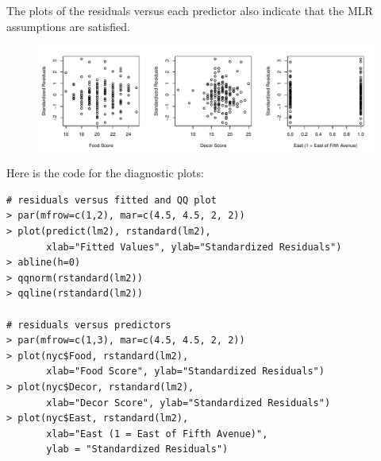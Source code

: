 \documentclass[10pt]{beamer}\usepackage[]{graphicx}\usepackage[]{color}
\begin{document}
\begin{frame}
The plots of the residuals versus each predictor also indicate that the MLR assumptions are satisfied.
\begin{figure}
\includegraphics[scale=0.55]{figure/resid_x.pdf}
\end{figure}
\end{frame}

\begin{frame}[fragile]
Here is the code for the diagnostic plots:
\small
\begin{verbatim}
# residuals versus fitted and QQ plot
> par(mfrow=c(1,2), mar=c(4.5, 4.5, 2, 2))
> plot(predict(lm2), rstandard(lm2), 
       xlab="Fitted Values", ylab="Standardized Residuals")
> abline(h=0)
> qqnorm(rstandard(lm2))
> qqline(rstandard(lm2))

# residuals versus predictors
> par(mfrow=c(1,3), mar=c(4.5, 4.5, 2, 2))
> plot(nyc$Food, rstandard(lm2), 
       xlab="Food Score", ylab="Standardized Residuals")
> plot(nyc$Decor, rstandard(lm2), 
       xlab="Decor Score", ylab="Standardized Residuals")
> plot(nyc$East, rstandard(lm2), 
       xlab="East (1 = East of Fifth Avenue)", 
       ylab = "Standardized Residuals")
\end{verbatim}
\end{frame}
\end{document}

